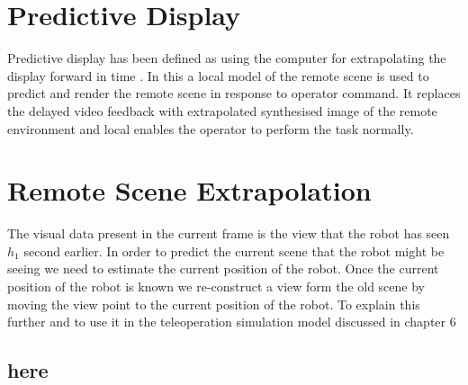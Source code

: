 \section{Predictive Display}
Predictive display has been defined as using the computer for extrapolating the display forward in time \cite{sheridan}. In this a local model of the remote scene is used to predict and render the remote scene in response to operator command. It replaces the delayed video feedback with extrapolated synthesised  image of the remote environment and local enables the operator to perform the task normally. 

\section{Remote Scene Extrapolation} 
The visual data present in the current frame is the view that the robot has seen $h_1$ second earlier. In order to predict the current scene that the robot might be seeing we need to estimate the current position of the robot. Once the current position of the robot is known we re-construct a view form the old scene by moving the view point to the current position of the robot. To explain this further and to use it in the teleoperation simulation model discussed in chapter 6
\subsection{here}

